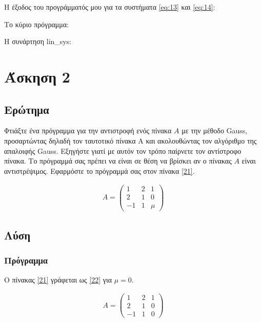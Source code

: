 \documentclass[12pt, fleqn, leqno]{extreport}
\begin{document}
Η έξοδος του προγράμματός μου για τα συστήματα \eqref{eq:13} και \eqref{eq:14}:


\newpage
Το κύριο πρόγραμμα:


\newpage
Η συνάρτηση lin\_sys:\label{lin_sys}


\chapter{Άσκηση 2}
\section{Ερώτημα}

Φτιάξτε ένα πρόγραμμα για την αντιστροφή ενός πίνακα $A$ με την μέθοδο Gauss, προσαρτώντας δηλαδή τον ταυτοτικό πίνακα Α και ακολουθώντας τον αλγόριθμο της απαλοιφής Gauss. Εξηγήστε γιατί με αυτόν τον τρόπο παίρνετε τον αντίστροφο πίνακα. Το πρόγραμμά σας πρέπει να είναι σε θέση να βρίσκει αν ο πίνακας $A$ είναι αντιστρέψιμος. Εφαρμόστε το πρόγραμμά σας στον πίνακα \eqref{21}.

\begin{equation}
    \begin{aligned}
        A = \begin{pmatrix}
            1  & 2 & 1   \\
            2  & 1 & 0   \\
            -1 & 1 & \mu
        \end{pmatrix}\label{21}
    \end{aligned}
\end{equation}


\newpage
\section{Λύση}
\subsection{Πρόγραμμα}

Ο πίνακας \eqref{21} γράφεται ως \eqref{22} για $\mu = 0$.

\begin{equation}
    \begin{aligned}
        A = \begin{pmatrix}
            1  & 2 & 1 \\
            2  & 1 & 0 \\
            -1 & 1 & 0
        \end{pmatrix}\label{22}
    \end{aligned}
\end{equation}
\end{document}
